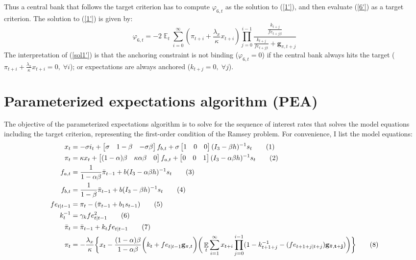 \documentclass[11pt]{article}
\renewcommand{\[}{\begin{equation}}
\renewcommand{\]}{\end{equation}}
\DeclareMathOperator{\E}{\mathbb{E}}
\newcommand\numberthis{\addtocounter{equation}{1}\tag{\theequation}} %
\begin{document}
Thus a central bank that follows the target criterion has to compute $\varphi_{6,t}$ as the solution to (\ref{1'}), and then evaluate (\ref{6'}) as a target criterion. The solution to (\ref{1'}) is given by:
\begin{equation}
\varphi_{6,t} = -2\E_t\sum_{i=0}^{\infty}(\pi_{t+i}+\frac{\lambda_x}{\kappa}x_{t+i})\prod_{j=0}^{i-1}\frac{\frac{k_{t+j}}{fe_{t+j|t}}}{\frac{k_{t+j}}{fe_{t+j|t}} + \mathbf{g}_{\pi,t+j}} \label{sol1'}
\end{equation}
The interpretation of (\ref{sol1'}) is that the anchoring constraint is not binding ($\varphi_{6,t}=0$) if the central bank always hits the target ($\pi_{t+i}+\frac{\lambda_x}{\kappa}x_{t+i} = 0, \; \forall i$); or expectations are always anchored ($k_{t+j}=0, \; \forall j$). 

\section{Parameterized expectations algorithm (PEA)} \label{pea}
The objective of the parameterized expectations algorithm is to solve for the sequence of interest rates that solves the model equations including the target criterion, representing the first-order condition of the Ramsey problem. For convenience, I list the model equations:
\begin{align*}
x_t &=  -\sigma i_t + \begin{bmatrix} \sigma & 1-\beta & -\sigma\beta \end{bmatrix} f_{b,t} + \sigma \begin{bmatrix} 1 & 0 & 0 \end{bmatrix} (I_{3} - \beta h)^{-1} s_t \label{A9} \numberthis \\
\pi_t &= \kappa x_t  + \begin{bmatrix} (1-\alpha)\beta & \kappa\alpha\beta & 0 \end{bmatrix}  f_{a,t} + \begin{bmatrix} 0 & 0 & 1 \end{bmatrix}  (I_{3} - \alpha \beta h)^{-1}  s_t \label{A10} \numberthis\\
f_{a,t} & = \frac{1}{1-\alpha\beta}\bar{\pi}_{t-1}  + b(I_{3} - \alpha\beta h)^{-1}s_t \numberthis \\
f_{b,t} & = \frac{1}{1-\beta}\bar{\pi}_{t-1}  + b(I_{3} - \beta h)^{-1}s_t  \label{A8} \numberthis \\
 fe_{t|t-1} &  = \pi_t - (\bar{\pi}_{t-1}+b_1 s_{t-1}) \label{A7} \numberthis \\
 k^{-1}_t & = \gamma_k fe_{t|t-1}^2 \numberthis  \\
 \bar{\pi}_{t} &  = \bar{\pi}_{t-1} +k_tfe_{t|t-1} \numberthis \\
 \pi_t & = -\frac{\lambda_x}{\kappa}\bigg\{x_t - \frac{(1-\alpha)\beta}{1-\alpha\beta} \bigg(k_t+fe_{t|t-1}\mathbf{g}_{\pi,t} \bigg) \bigg(\E_t\sum_{i=1}^{\infty}x_{t+i}\prod_{j=0}^{i-1}(1-k_{t+1+j}^{-1} - (fe_{t+1+j|t+j})\mathbf{g_{\bar{\pi}, t+j}}) \bigg)
\bigg\} \numberthis \label{B1}
\end{align*}
\end{document}
